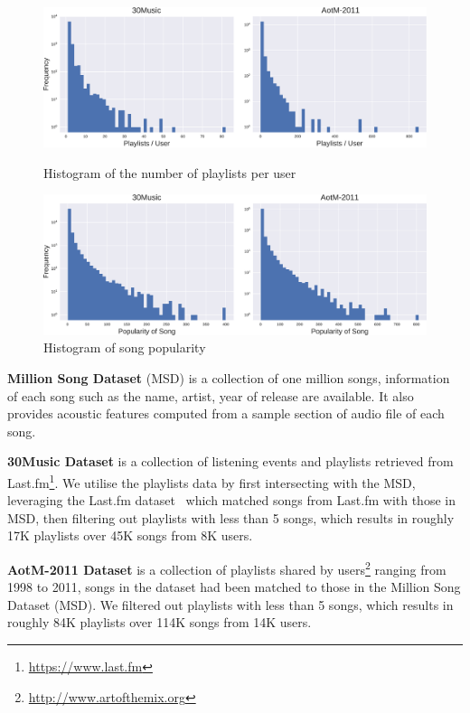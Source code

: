 \begin{figure}[!t]
    \centering
    \begin{minipage}{.5\textwidth}
        \centering
        \includegraphics[width=.95\linewidth]{fig/hist_pluser.pdf}
        \caption{Histogram of the number of playlists per user}
        \label{fig:hist_pluser}
    \end{minipage}%
    \begin{minipage}{0.5\textwidth}
        \centering
        \includegraphics[width=.95\linewidth]{fig/hist_songpop.pdf}
        \caption{Histogram of song popularity}
        \label{fig:hist_songpop}
    \end{minipage}
\end{figure}

{\bf Million Song Dataset} (MSD) is a collection of one million songs, information of each song such as the name, artist, year of release are available.
It also provides acoustic features computed from a sample section of audio file of each song. %

{\bf 30Music Dataset} is a collection of listening events and playlists retrieved from Last.fm\footnote{\url{https://www.last.fm}}.
We utilise the playlists data by first intersecting with the MSD, leveraging the Last.fm dataset~\cite{lastfmdataset}
which matched songs from Last.fm with those in MSD, then filtering out playlists with less than 5 songs,
which results in roughly 17K playlists over 45K songs from 8K users.

{\bf AotM-2011 Dataset} is a collection of playlists shared by users\footnote{\url{http://www.artofthemix.org}} ranging from 1998 to 2011,
songs in the dataset had been matched to those in the Million Song Dataset (MSD).
We filtered out playlists with less than 5 songs, which results in roughly 84K playlists over 114K songs from 14K users.

